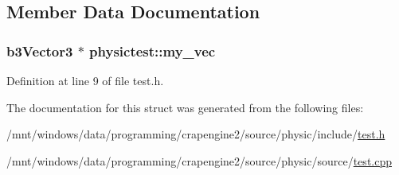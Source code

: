 \subsection{Member Data Documentation}
\hypertarget{structphysictest_ab2290d86b0690be6379009e92e3b8768}{
\subsubsection[{my\+\_\+vec}]{\setlength{\rightskip}{0pt plus 5cm}b3\+Vector3 $\ast$ physictest\+::my\+\_\+vec}}\label{structphysictest_ab2290d86b0690be6379009e92e3b8768}


Definition at line 9 of file test.\+h.



The documentation for this struct was generated from the following files\+:\begin{DoxyCompactItemize}
\item 
/mnt/windows/data/programming/crapengine2/source/physic/include/\hyperlink{physic_2include_2test_8h}{test.\+h}\item 
/mnt/windows/data/programming/crapengine2/source/physic/source/\hyperlink{physic_2source_2test_8cpp}{test.\+cpp}\end{DoxyCompactItemize}
